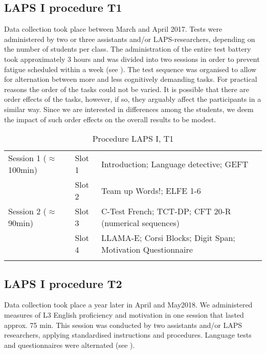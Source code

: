 \documentclass[output=paper]{langsci/langscibook}
\begin{document}
  \subsection{LAPS I procedure T1}


Data collection took place between March and April 2017. Tests were administered by two or three assistants and/or LAPS-researchers, depending on the number of students per class. The administration of the entire test battery took approximately 3 hours and was divided into two sessions in order to prevent fatigue scheduled within a week (see ). The test sequence was organised to allow for alternation between more and less cognitively demanding tasks. For practical reasons the order of the tasks could not be varied. It is possible that there are order effects of the tasks, however, if so, they arguably affect the participants in a similar way. Since we are interested in differences among the students, we deem the impact of such order effects on the overall results to be modest.


\begin{table}
\begin{tabularx}{\textwidth}{llQ}
\lsptoprule

Session 1 (${\approx}$100min) & Slot 1 & Introduction; Language detective; GEFT\\
                              & Slot 2 & Team up Words!; ELFE 1-6\\
Session 2 (${\approx}$90min) & Slot 3 & C-Test French; TCT-DP; CFT 20-R (numerical sequences)\\
                             & Slot 4 & LLAMA-E; Corsi Blocks; Digit Span; Motivation Questionnaire\\
\lspbottomrule
\end{tabularx}
\caption{Procedure LAPS I, T1\label{tab:02:3}}
\end{table}

\subsection{LAPS I procedure T2}


Data collection took place a year later in April and May2018. We administered measures of L3 English proficiency and motivation in one session that lasted approx. 75 min. This session was conducted by two assistants and/or LAPS researchers, applying standardised instructions and procedures. Language tests and questionnaires were alternated (see ). 
\end{document}
